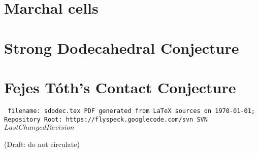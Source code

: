 \documentclass{llncs}
\def\svninfo{{\tt
  filename: sdodec.tex\hfill\break
  PDF generated from LaTeX sources on \today; \hfill\break
  Repository Root: https://flyspeck.googlecode.com/svn \hfill\break
  SVN $LastChangedRevision$
  }
  }
\begin{document}
\section{Marchal cells}

\section{Strong Dodecahedral Conjecture}

\section{Fejes T\'oth's Contact Conjecture}

\raggedright



\bigskip
\noindent
\svninfo
\smallskip

\smallskip
(Draft: do not circulate) %
\end{document}
